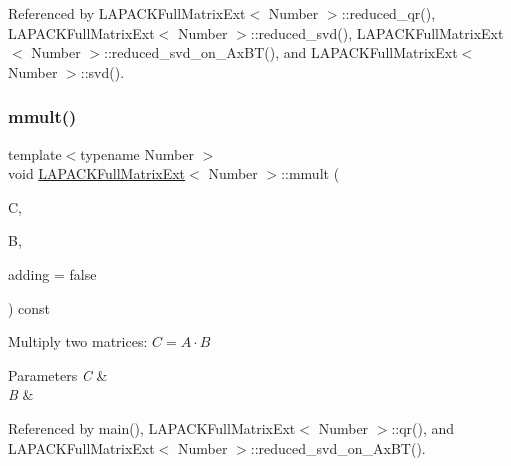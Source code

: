 Referenced by L\+A\+P\+A\+C\+K\+Full\+Matrix\+Ext$<$ Number $>$\+::reduced\+\_\+qr(), L\+A\+P\+A\+C\+K\+Full\+Matrix\+Ext$<$ Number $>$\+::reduced\+\_\+svd(), L\+A\+P\+A\+C\+K\+Full\+Matrix\+Ext$<$ Number $>$\+::reduced\+\_\+svd\+\_\+on\+\_\+\+Ax\+B\+T(), and L\+A\+P\+A\+C\+K\+Full\+Matrix\+Ext$<$ Number $>$\+::svd().

\mbox{\label{classLAPACKFullMatrixExt_a176ae32c5467facafd5dcc3252c07c20}} 
\subsubsection{\texorpdfstring{mmult()}{mmult()}}
{\footnotesize\ttfamily template$<$typename Number $>$ \\
void \hyperlink{classLAPACKFullMatrixExt}{L\+A\+P\+A\+C\+K\+Full\+Matrix\+Ext}$<$ Number $>$\+::mmult (\begin{DoxyParamCaption}\item[{\hyperlink{classLAPACKFullMatrixExt}{L\+A\+P\+A\+C\+K\+Full\+Matrix\+Ext}$<$ Number $>$ \&}]{C,  }\item[{const \hyperlink{classLAPACKFullMatrixExt}{L\+A\+P\+A\+C\+K\+Full\+Matrix\+Ext}$<$ Number $>$ \&}]{B,  }\item[{const bool}]{adding = {\ttfamily false} }\end{DoxyParamCaption}) const}

Multiply two matrices\+: $C = A \cdot B$ 
\begin{DoxyParams}{Parameters}
{\em C} & \\
\hline
{\em B} & \\
\hline
\end{DoxyParams}


Referenced by main(), L\+A\+P\+A\+C\+K\+Full\+Matrix\+Ext$<$ Number $>$\+::qr(), and L\+A\+P\+A\+C\+K\+Full\+Matrix\+Ext$<$ Number $>$\+::reduced\+\_\+svd\+\_\+on\+\_\+\+Ax\+B\+T().

\mbox{\label{classLAPACKFullMatrixExt_a48a8520d322ba5be9f5bb38e67f9b01b}} 
